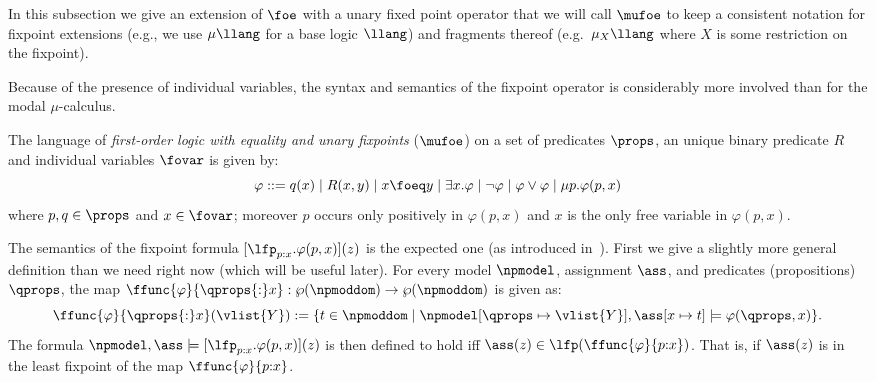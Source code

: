 

In this subsection we give an extension of $\foe$ with a unary fixed point operator %
that we will call $\mufoe$ %
to keep a consistent notation for fixpoint extensions (e.g., we use $\mu\llang$ for a base logic $\llang$) and fragments thereof (e.g.~$\mu_X\llang$ where $X$ is some restriction on the fixpoint).
%

Because of the presence of individual variables, the syntax and semantics of the fixpoint operator is considerably more involved than for the modal $\mu$-calculus.


\begin{definition}
The language of \emph{first-order logic with equality and unary fixpoints} ($\mufoe$) on a set of predicates $\props$, an unique binary predicate $R$ and individual variables $\fovar$ is given by:\[
\varphi ::= q(x) \mid R(x,y) \mid x \foeq y \mid \exists x.\varphi \mid \lnot\varphi \mid \varphi \lor \varphi \mid \mu p. \varphi(p,x)
\]
where $p,q\in\props$ and $x\in\fovar$;  moreover $p$ occurs only positively in $\varphi(p,x)$ and $x$ is the only free variable in $\varphi(p,x)$.
\end{definition}



The semantics of the fixpoint formula $[\lfp_{p{:}x}.\varphi(p,x)](z)$ is the expected one (as introduced in~\cite{Chandra1982,Moschovakis2008,MoschovakisOrig}). First we give a slightly more general definition than we need right now (which will be useful later). For every model $\npmodel$, assignment $\ass$, and predicates (propositions) $\qprops$, the map $\ffunc{\varphi}{\qprops{:}x}:\wp(\npmoddom)\to \wp(\npmoddom)$ is given as:
\[
\ffunc{\varphi}{\qprops{:}x}(\vlist{Y}) := \{t \in \npmoddom \mid \npmodel[\qprops \mapsto \vlist{Y}],\ass[x\mapsto t] \models \varphi(\qprops, x) \}.
\]
%
The formula $\npmodel,\ass \models [\lfp_{p{:}x}.\varphi(p,x)](z)$ is then defined to hold iff $\ass(z) \in \lfp(\ffunc{\varphi}{p{:}x})$. That is, if $\ass(z)$ is in the least fixpoint of the map $\ffunc{\varphi}{p{:}x}$.

